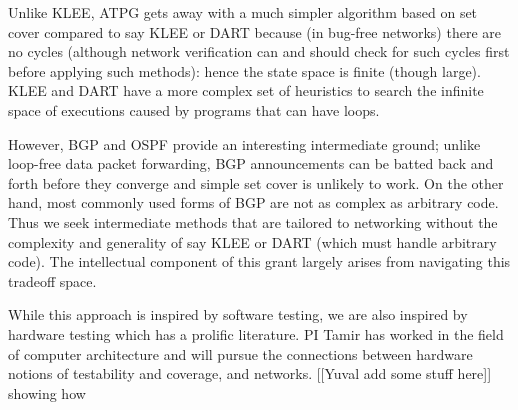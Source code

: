 Unlike KLEE, ATPG gets away with a much simpler algorithm based on set cover compared to say KLEE or DART because (in bug-free networks) there are no cycles (although network verification can and should check for such cycles first before applying such methods): hence the state space is finite (though large).   KLEE and DART have a more complex set of heuristics to search the infinite 
space of executions caused by programs that can have loops.   

However, BGP and OSPF provide
an interesting intermediate ground; unlike loop-free data packet forwarding, BGP announcements can be batted back and forth before they converge
and simple set cover is unlikely to work.   On the other hand, most commonly used forms of BGP are not as complex as arbitrary code.
Thus we seek intermediate methods that are tailored to networking without the complexity and generality of
say KLEE or DART (which must handle arbitrary code).   The intellectual component of this grant largely arises from navigating this tradeoff space.  

While this approach is inspired by software testing, we are also inspired by hardware testing which has a prolific literature.  PI Tamir has worked in the field of computer architecture and will pursue the connections between hardware notions of testability and coverage, and networks.  [[Yuval add some stuff here]]
showing how 


